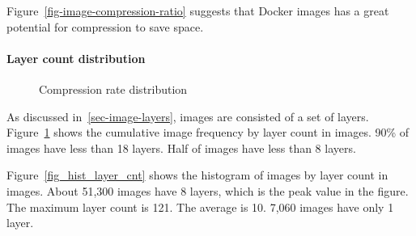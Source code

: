 Figure~\ref{fig-image-compression-ratio} suggests that Docker images has a great potential for compression to save space.

\paragraph{Layer count distribution}

\begin{figure}[!t]
	\centering
	\caption{Compression rate distribution}
	\label{fig-layer-cnt}
\end{figure}

As discussed in~\ref{sec-image-layers}, images are consisted of a set of layers. Figure~\ref{fig-layer-cnt} shows the cumulative image frequency by layer count in images. 90\% of images have less than 18 layers. Half of images have less than 8 layers. 

Figure~\ref{fig_hist_layer_cnt} shows the histogram of images by layer count in images. About 51,300 images have 8 layers, which is the peak value in the figure. The maximum layer count is 121. The average is 10. 7,060 images have only 1 layer. 

